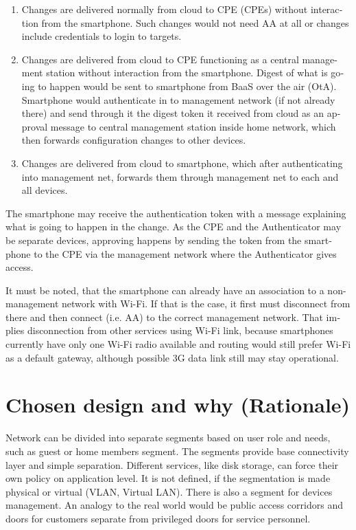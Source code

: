 \documentclass[12pt,a4paper,english]{tutthesis}
\begin{document}
\begin{otherlanguage}{english}
\begin{enumerate}
\item Changes are delivered normally from cloud to CPE (CPEs) without
interaction from the smartphone. Such changes would not need
AA at all or changes include credentials to login to targets.

\item Changes are delivered from cloud to CPE functioning as a central
management station without interaction from the smartphone.  Digest
of what is going to happen would be sent to smartphone from BaaS
over the air (OtA). Smartphone would authenticate in to management
network (if not already there) and send through it the digest token
it received from cloud as an approval message to central management
station inside home network, which then forwards configuration changes
to other devices.

\item Changes are delivered from cloud to smartphone, which after
authenticating into management net, forwards them through management
net to each and all devices.
\end{enumerate}


The smartphone may receive the authentication token with 
a message explaining what is going to happen in the change.
As the CPE and the Authenticator may be separate devices, approving
happens by sending the token from the smartphone to the CPE via the
management network where the Authenticator gives access.

It must be noted, that the smartphone can already have an association
to a non-management network with Wi-Fi. If that is the case, it first
must disconnect from there and then connect (i.e. AA) to the correct management
network. That implies disconnection from other services using Wi-Fi
link, because smartphones currently have only one Wi-Fi radio
available and routing would still prefer Wi-Fi as a default gateway, although
possible 3G data link still may stay operational.


\section{Chosen design and why (Rationale)}
\label{sec-4-3}
\label{sec:chosendesign}   
Network can be divided into separate segments based on user role and
needs, such as guest or home members segment. The segments provide
base connectivity layer and simple separation. Different
services, like disk storage, can force their own policy on application
level.
It is not defined, if the segmentation is made 
physical or virtual (VLAN, Virtual LAN). 
There is also a segment for devices management. 
An analogy to the real world would be public access corridors and doors for
customers separate from privileged doors for service personnel.



\end{otherlanguage}
\end{document}
